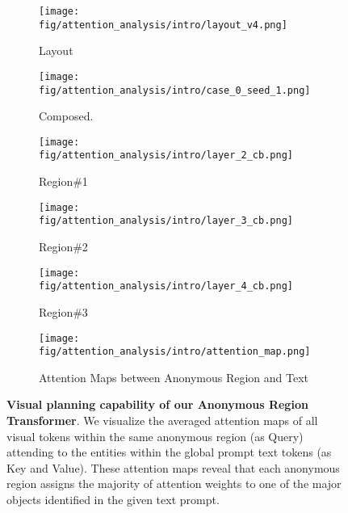 \begin{figure}[!t]
\begin{minipage}[!t]{1\linewidth}
\begin{subfigure}[b]{0.19\textwidth}
\centering
\texttt{[image: fig/attention\_analysis/intro/layout\_v4.png]}
\vspace{-3mm}
\caption*{Layout}
\end{subfigure}
\begin{subfigure}[b]{0.19\textwidth}
\centering
\texttt{[image: fig/attention\_analysis/intro/case\_0\_seed\_1.png]}
\vspace{-3mm}
\caption*{Composed.}
\end{subfigure}
\begin{subfigure}[b]{0.19\textwidth}
\centering
\texttt{[image: fig/attention\_analysis/intro/layer\_2\_cb.png]}
\vspace{-3mm}
\caption*{Region\#1}
\end{subfigure}
\begin{subfigure}[b]{0.19\textwidth}
\centering
\texttt{[image: fig/attention\_analysis/intro/layer\_3\_cb.png]}
\vspace{-3mm}
\caption*{Region\#2}
\end{subfigure}
\begin{subfigure}[b]{0.19\textwidth}
\centering
\texttt{[image: fig/attention\_analysis/intro/layer\_4\_cb.png]}
\vspace{-3mm}
\caption*{Region\#3}
\end{subfigure}
\hfill
\begin{subfigure}[b]{1\textwidth}
\centering
\texttt{[image: fig/attention\_analysis/intro/attention\_map.png]}
\vspace{-4mm}
\caption*{Attention Maps between Anonymous Region and Text}
\end{subfigure}
\end{minipage}
\vspace{-2mm}
\caption{\footnotesize{
\textbf{Visual planning capability of our Anonymous Region Transformer}. We visualize the averaged attention maps of all visual tokens within the same anonymous region (as Query) attending to the entities within the global prompt text tokens (as Key and Value). These attention maps reveal that each anonymous region assigns the majority of attention weights to one of the major objects identified in the given text prompt. }}
\label{fig:attention_analysis}
\vspace{-3mm}
\end{figure}

